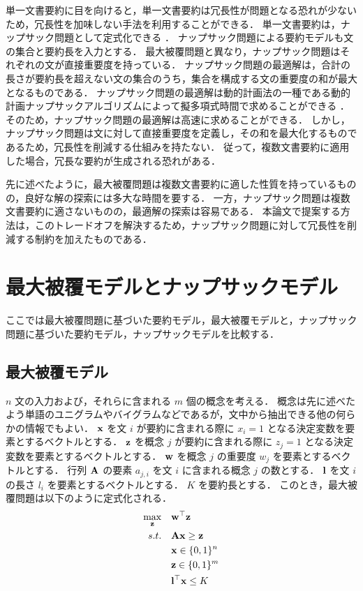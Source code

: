\documentclass[japanese]{jnlp_1.4}
\begin{document}
単一文書要約に目を向けると，単一文書要約は冗長性が問題となる恐れが少ないため，冗長性を加味しない手法を利用することができる．
単一文書要約は，ナップサック問題として定式化できる \cite{mcdonald07,hirao09b}．
ナップサック問題による要約モデルも文の集合と要約長を入力とする．
最大被覆問題と異なり，ナップサック問題はそれぞれの文が直接重要度を持っている．
ナップサック問題の最適解は，合計の長さが要約長を超えない文の集合のうち，集合を構成する文の重要度の和が最大となるものである．
ナップサック問題の最適解は動的計画法の一種である動的計画ナップサックアルゴリズムによって擬多項式時間で求めることができる \cite{korte08}．
そのため，ナップサック問題の最適解は高速に求めることができる．
しかし，ナップサック問題は文に対して直接重要度を定義し，その和を最大化するものであるため，冗長性を削減する仕組みを持たない．
従って，複数文書要約に適用した場合，冗長な要約が生成される恐れがある．

先に述べたように，最大被覆問題は複数文書要約に適した性質を持っているものの，良好な解の探索には多大な時間を要する．
一方，ナップサック問題は複数文書要約に適さないものの，最適解の探索は容易である．
本論文で提案する方法は，このトレードオフを解決するため，ナップサック問題に対して冗長性を削減する制約を加えたものである．



\section{最大被覆モデルとナップサックモデル}

ここでは最大被覆問題に基づいた要約モデル，最大被覆モデルと，ナップサック問題に基づいた要約モデル，ナップサックモデルを比較する．

\subsection{最大被覆モデル}

$n$ 文の入力および，それらに含まれる $ m $ 個の概念を考える．
概念は先に述べたよう単語のユニグラムやバイグラムなどであるが，文中から抽出できる他の何らかの情報でもよい．
$ {\bf x} $ を文 $ i $ が要約に含まれる際に $ x_{i} = 1 $ となる決定変数を要素とするベクトルとする．
$ {\bf z} $ を概念 $ j $ が要約に含まれる際に $ z_{j} = 1 $ となる決定変数を要素とするベクトルとする．
$ {\bf w} $ を概念 $ j $ の重要度 $ w_{j} $ を要素とするベクトルとする．
行列 $ {\bf A} $ の要素 $ a_{j,i} $ を文 $ i $ に含まれる概念 $ j $ の数とする．
$ {\bf l} $ を文 $ i $ の長さ $ l_{i} $ を要素とするベクトルとする．
$ K $ を要約長とする．
このとき，最大被覆問題は以下のように定式化される．
\begin{align}
\max_{{\bf z}} & \quad {\bf w}^{\top} {\bf z} \\
s.t. & \quad {\bf Ax} \geq {\bf z} \\
& \quad {\bf x} \in \{0, 1\}^{n} \\
& \quad {\bf z} \in \{0, 1\}^{m} \\
& \quad {\bf l}^{\top} {\bf x} \leq K
\end{align}
\pagebreak
\end{document}
